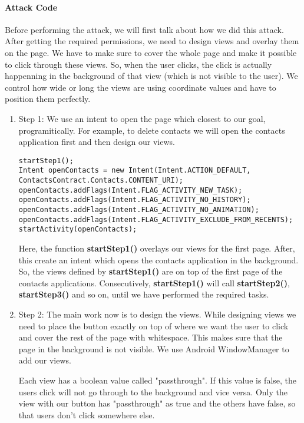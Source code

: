\paragraph{Attack Code}
Before performing the attack, we will first talk about how we did this attack. \\
After getting the required permissions, we need to design views and overlay them on the page. We have to make sure to cover the whole page and make it possible to click through these views. So, when the user clicks, the click is actually happenning in the background of that view (which is not visible to the user). We control how wide or long the views are using coordinate values and have to position them perfectly. 

\begin{enumerate}

\item Step 1: We use an intent to open the page which closest to our goal,
programitically. For example, to delete contacts we will open the contacts
application first and then design our views.
    
\begin{lstlisting}
startStep1();
Intent openContacts = new Intent(Intent.ACTION_DEFAULT,  ContactsContract.Contacts.CONTENT_URI);
openContacts.addFlags(Intent.FLAG_ACTIVITY_NEW_TASK);
openContacts.addFlags(Intent.FLAG_ACTIVITY_NO_HISTORY);
openContacts.addFlags(Intent.FLAG_ACTIVITY_NO_ANIMATION);
openContacts.addFlags(Intent.FLAG_ACTIVITY_EXCLUDE_FROM_RECENTS);
startActivity(openContacts);
\end{lstlisting}

Here, the function \textbf{startStep1()} overlays our views for the first
page.  After, this create an intent which opens the contacts application in
the background. So, the views defined by \textbf{startStep1()} are on top
of the first page of the contacts applications. Consecutively,
\textbf{startStep1()} will call \textbf{startStep2()},
\textbf{startStep3()} and so on, until we have performed the required
tasks.

\item Step 2: The main work now is to design the views. While designing
views we need to place the button exactly on top of where we want the user
to click and cover the rest of the page with whitespace. This makes sure
that the page in the background is not visible. We use Android
WindowManager to add our views.

Each view has a boolean value called "passthrough". If this value is false,
the users click will not go through to the background and vice versa. Only
the view with our button has "passthrough" as true and the others have
false, so that users don't click
somewhere else.


\end{enumerate}
